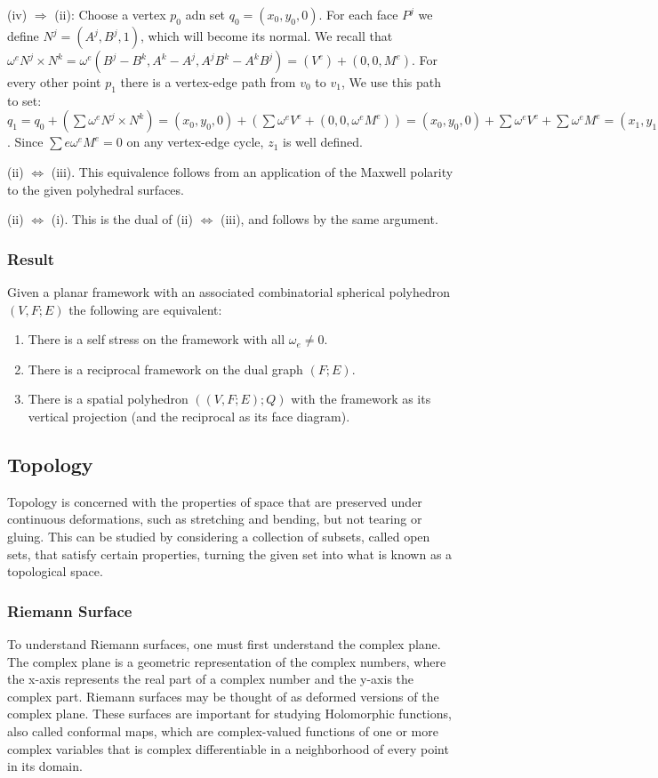 \documentclass[english]{article}
\begin{document}
(iv) $\Rightarrow$ (ii): Choose a vertex $p_0$ adn set $q_0 = (x_0, y_0,0)$. For each face $P^j$ we define $N^j = (A^j,B^j,1)$, which will become its normal. We recall that $\omega^eN^j \times N^k = \omega^e(B^j-B^k,A^k-A^j, A^jB^k-A^kB^j) = (V^e) + (0,0,M^e)$. For every other point $p_1$ there is a vertex-edge path from $v_0$ to $v_1$, We use this path to set: $q_1 = q_0 + (\sum \omega^eN^j \times N^k) = (x_0,y_0,0) + (\sum \omega^eV^e + (0,0,\omega^eM^e)) = (x_0,y_0,0) + \sum \omega^eV^e + \sum \omega^eM^e = (x_1,y_1,0) + (0,0,\sum \omega_eM^e)$. Since $\sum{e}\omega^eM^e = 0$ on any vertex-edge cycle, $z_1$ is well defined.

(ii) $\Leftrightarrow$ (iii). This equivalence follows from an application of the Maxwell polarity to the given polyhedral surfaces.

(ii) $\Leftrightarrow$ (i). This is the dual of (ii) $\Leftrightarrow$ (iii), and follows by the same argument. 

 
 
\subsubsection{Result}

Given a planar framework with an associated combinatorial spherical polyhedron $(V,F;E)$ the following are equivalent:
\begin{enumerate}
	\item There is a self stress on the framework with all $\omega_e \neq 0$.
	\item There is a reciprocal framework on the dual graph $(F;E)$.
	\item There is a spatial polyhedron $((V,F;E);Q)$ with the framework as its vertical projection (and the reciprocal as its face diagram).
 \end{enumerate}
  \subsection{Topology}
 Topology is concerned with the properties of space that are preserved under continuous deformations, such as stretching and bending, but not tearing or gluing. This can be studied by considering a collection of subsets, called open sets, that satisfy certain properties, turning the given set into what is known as a topological space. 
  \subsubsection{Riemann Surface}
  To understand Riemann surfaces, one must first understand the complex plane. The complex plane is a geometric representation of the complex numbers, where the x-axis represents the real part of a complex number and the y-axis the complex part. Riemann surfaces may be thought of as deformed versions of the complex plane. These surfaces are important for studying Holomorphic functions, also called conformal maps, which are complex-valued functions of one or more complex variables that is complex differentiable in a neighborhood of every point in its domain.
  
\end{document}
